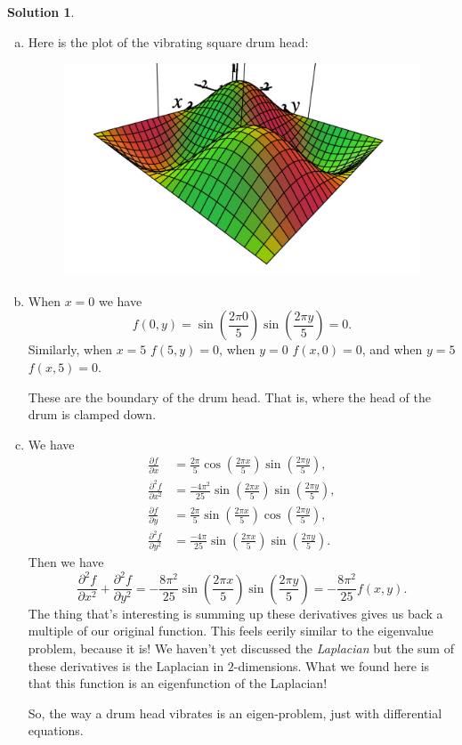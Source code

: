 \documentclass[12pt]{report} %
\theoremstyle{definition}
\newtheorem{solution}{Solution}
\begin{document}
\begin{solution}~
\begin{enumerate}[(a)]
    \item Here is the plot of the vibrating square drum head:
    \begin{figure}[H]
        \centering
        \includegraphics[width=.6\textwidth]{Images/square_drum.png}
    \end{figure}
    \item When $x=0$ we have
    \[
    f(0,y) = \sin\left( \frac{2\pi 0}{5}\right) \sin\left(\frac{2\pi y}{5}\right) = 0.
    \]
    Similarly, when $x=5$ $f(5,y)=0$, when $y=0$ $f(x,0)=0$, and when $y=5$ $f(x,5)=0$. 
    
    These are the boundary of the drum head.  That is, where the head of the drum is clamped down.
    
    \item We have
    \begin{align*}
        \frac{\partial f}{\partial x} &= \frac{2\pi}{5} \cos \left( \frac{2\pi x}{5} \right) \sin \left( \frac{2\pi y}{5} \right),\\
        \frac{\partial^2 f}{\partial x^2} &= \frac{-4\pi^2}{25} \sin \left( \frac{2\pi x}{5} \right) \sin \left( \frac{2\pi y}{5} \right),\\
        \frac{\partial f}{\partial y} &= \frac{2\pi}{5} \sin \left( \frac{2\pi x}{5} \right) \cos \left( \frac{2\pi y}{5} \right),\\
        \frac{\partial^2 f}{\partial y^2} &= \frac{-4\pi}{25} \sin \left( \frac{2\pi x}{5} \right) \sin \left( \frac{2\pi y}{5} \right).
    \end{align*}
    Then we have
    \[
    \frac{\partial^2 f}{\partial x^2} + \frac{\partial^2 f}{\partial y^2} = -\frac{8\pi^2}{25} \sin \left( \frac{2\pi x}{5} \right) \sin \left( \frac{2\pi y}{5} \right) = -\frac{8\pi^2}{25} f(x,y).
    \]
    The thing that's interesting is summing up these derivatives gives us back a multiple of our original function.  This feels eerily similar to the eigenvalue problem, because it is!  We haven't yet discussed the \emph{Laplacian} but the sum of these derivatives is the Laplacian in $2$-dimensions.  What we found here is that this function is an eigenfunction of the Laplacian! 
    
    So, the way a drum head vibrates is an eigen-problem, just with differential equations.
\end{enumerate}
\end{solution}
\end{document}
